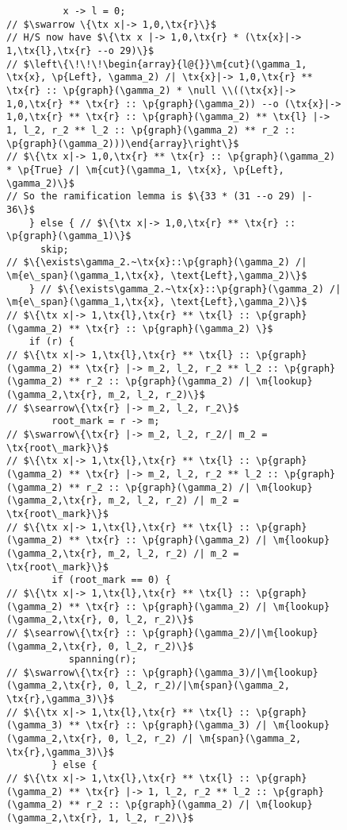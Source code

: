 \documentclass{article}
\newcommand{\tx}[1]{\text{#1}}
\newcommand{\p}[1]{\ensuremath{\mathsf{#1}}} %
\newcommand{\m}[1]{\ensuremath{\mathit{#1}}} %
\begin{document}
\begin{figure}[t]
\begin{lstlisting}
          x -> l = 0;
// $\swarrow \{\tx x|-> 1,0,\tx{r}\}$
// H/S now have $\{\tx x |-> 1,0,\tx{r} * (\tx{x}|-> 1,\tx{l},\tx{r} --o 29)\}$
// $\left\{\!\!\!\begin{array}{l@{}}\m{cut}(\gamma_1, \tx{x}, \p{Left}, \gamma_2) /| \tx{x}|-> 1,0,\tx{r} ** \tx{r} :: \p{graph}(\gamma_2) * \null \\((\tx{x}|-> 1,0,\tx{r} ** \tx{r} :: \p{graph}(\gamma_2)) --o (\tx{x}|-> 1,0,\tx{r} ** \tx{r} :: \p{graph}(\gamma_2) ** \tx{l} |-> 1, l_2, r_2 ** l_2 :: \p{graph}(\gamma_2) ** r_2 :: \p{graph}(\gamma_2)))\end{array}\right\}$
// $\{\tx x|-> 1,0,\tx{r} ** \tx{r} :: \p{graph}(\gamma_2) * \p{True} /| \m{cut}(\gamma_1, \tx{x}, \p{Left}, \gamma_2)\}$
// So the ramification lemma is $\{33 * (31 --o 29) |- 36\}$
    } else { // $\{\tx x|-> 1,0,\tx{r} ** \tx{r} :: \p{graph}(\gamma_1)\}$
      skip;
// $\{\exists\gamma_2.~\tx{x}::\p{graph}(\gamma_2) /| \m{e\_span}(\gamma_1,\tx{x}, \text{Left},\gamma_2)\}$
    } // $\{\exists\gamma_2.~\tx{x}::\p{graph}(\gamma_2) /| \m{e\_span}(\gamma_1,\tx{x}, \text{Left},\gamma_2)\}$
// $\{\tx x|-> 1,\tx{l},\tx{r} ** \tx{l} :: \p{graph}(\gamma_2) ** \tx{r} :: \p{graph}(\gamma_2) \}$
    if (r) {
// $\{\tx x|-> 1,\tx{l},\tx{r} ** \tx{l} :: \p{graph}(\gamma_2) ** \tx{r} |-> m_2, l_2, r_2 ** l_2 :: \p{graph}(\gamma_2) ** r_2 :: \p{graph}(\gamma_2) /| \m{lookup}(\gamma_2,\tx{r}, m_2, l_2, r_2)\}$
// $\searrow\{\tx{r} |-> m_2, l_2, r_2\}$
        root_mark = r -> m;
// $\swarrow\{\tx{r} |-> m_2, l_2, r_2/| m_2 = \tx{root\_mark}\}$
// $\{\tx x|-> 1,\tx{l},\tx{r} ** \tx{l} :: \p{graph}(\gamma_2) ** \tx{r} |-> m_2, l_2, r_2 ** l_2 :: \p{graph}(\gamma_2) ** r_2 :: \p{graph}(\gamma_2) /| \m{lookup}(\gamma_2,\tx{r}, m_2, l_2, r_2) /| m_2 = \tx{root\_mark}\}$
// $\{\tx x|-> 1,\tx{l},\tx{r} ** \tx{l} :: \p{graph}(\gamma_2) ** \tx{r} :: \p{graph}(\gamma_2) /| \m{lookup}(\gamma_2,\tx{r}, m_2, l_2, r_2) /| m_2 = \tx{root\_mark}\}$
        if (root_mark == 0) {
// $\{\tx x|-> 1,\tx{l},\tx{r} ** \tx{l} :: \p{graph}(\gamma_2) ** \tx{r} :: \p{graph}(\gamma_2) /| \m{lookup}(\gamma_2,\tx{r}, 0, l_2, r_2)\}$
// $\searrow\{\tx{r} :: \p{graph}(\gamma_2)/|\m{lookup}(\gamma_2,\tx{r}, 0, l_2, r_2)\}$
           spanning(r);
// $\swarrow\{\tx{r} :: \p{graph}(\gamma_3)/|\m{lookup}(\gamma_2,\tx{r}, 0, l_2, r_2)/|\m{span}(\gamma_2, \tx{r},\gamma_3)\}$
// $\{\tx x|-> 1,\tx{l},\tx{r} ** \tx{l} :: \p{graph}(\gamma_3) ** \tx{r} :: \p{graph}(\gamma_3) /| \m{lookup}(\gamma_2,\tx{r}, 0, l_2, r_2) /| \m{span}(\gamma_2, \tx{r},\gamma_3)\}$
        } else {
// $\{\tx x|-> 1,\tx{l},\tx{r} ** \tx{l} :: \p{graph}(\gamma_2) ** \tx{r} |-> 1, l_2, r_2 ** l_2 :: \p{graph}(\gamma_2) ** r_2 :: \p{graph}(\gamma_2) /| \m{lookup}(\gamma_2,\tx{r}, 1, l_2, r_2)\}$

\end{lstlisting}
\end{figure}
\end{document}
